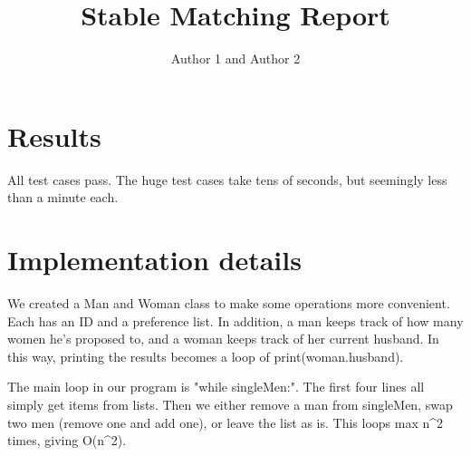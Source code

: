 \documentclass{article}
\title{Stable Matching Report}
\author{Author 1 and Author 2}
\begin{document}
  \maketitle

  \section{Results}

All test cases pass. The huge test cases take tens of seconds, but seemingly less than a minute each.

  \section{Implementation details}

We created a Man and Woman class to make some operations more convenient. Each has an ID and a preference list. In addition, a man keeps track of how many women he's proposed to, and a woman keeps track of her current husband. In this way, printing the results becomes a loop of print(woman.husband).

The main loop in our program is "while singleMen:". The first four lines all simply get items from lists. Then we either remove a man from singleMen, swap two men (remove one and add one), or leave the list as is. This loops max n^2 times, giving O(n^2).
\end{document}
